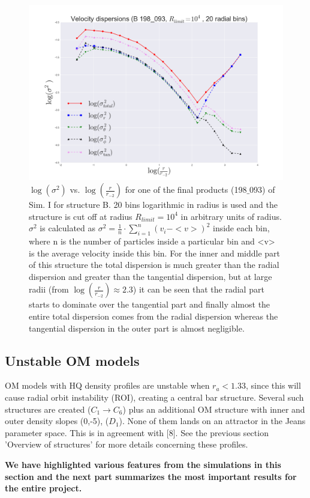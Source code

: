 \begin{figure}[!htbp]
\centering
\includegraphics[width=1.0\linewidth]{img/B_198_093_sigma_r_2.png}
\caption{$\log (\sigma^2)$ vs. $\log (\frac{r}{r_{-2}})$ for one of the final products (198$\_$093) of Sim. I for structure B. 
20 bins logarithmic in radius is used and the structure is cut off at radius $R_{limit} = 10^4$ in arbitrary units of radius.
$\sigma^2$ is calculated as $\sigma^2 = \frac{1}{n}\cdot \sum\limits_{i=1}^n (v_i - <v>)^2$ inside each bin, where n is the number of particles inside a particular bin and <v> is the average velocity inside this bin.
For the inner and middle part of this structure the total dispersion is much greater than the 
radial dispersion and greater than the tangential dispersion, but at large radii (from $\log (\frac{r}{r_{-2}}) \approx 2.3$) it can be seen that the radial part starts to dominate over the tangential part and finally almost the entire total dispersion comes from the radial dispersion whereas the tangential dispersion in the outer part is almost negligible.}
\label{fig:test}
\end{figure}

\subsection{Unstable OM models}
OM models with HQ density profiles are unstable when $r_a < 1.33$, since this will cause radial orbit instability (ROI), creating a central bar structure. Several such structures are created ($C_1 \rightarrow C_6$) plus an additional OM structure with inner and outer density slopes (0,-5), ($D_1$). None of them lands on an attractor in the Jeans parameter space. This is in agreement with [8]. See the previous section 'Overview of structures' for more details concerning these profiles.

\textbf{We have highlighted various features from the simulations in this section and the next part summarizes the most important results for the entire project.}
